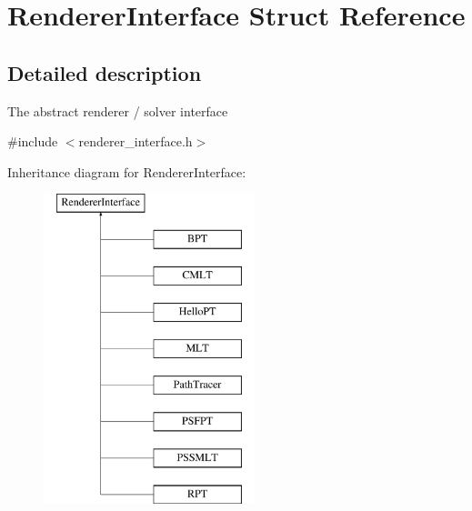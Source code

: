 \hypertarget{struct_renderer_interface}{}\section{Renderer\+Interface Struct Reference}
\label{struct_renderer_interface}


\subsection{Detailed description}
The abstract renderer / solver interface 

{\ttfamily \#include $<$renderer\+\_\+interface.\+h$>$}

Inheritance diagram for Renderer\+Interface\+:\begin{figure}[H]
\begin{center}
\leavevmode
\includegraphics[height=9.000000cm]{struct_renderer_interface}
\end{center}
\end{figure}
